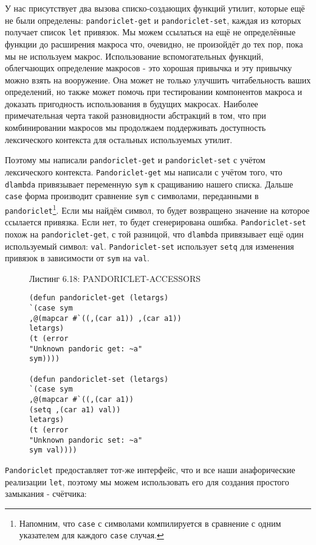 У нас присутствует два вызова списко-создающих функций утилит, которые ещё не были определены: \verb"pandoriclet-get" и \verb"pandoriclet-set", каждая из которых получает список \verb"let" привязок. Мы можем ссылаться на ещё не определённые функции до расширения макроса что, очевидно, не произойдёт до тех пор, пока мы не используем макрос. Использование вспомогательных функций, облегчающих определение макросов - это хорошая привычка и эту привычку можно взять на вооружение. Она может не только улучшить читабельность ваших определений, но также может помочь при тестировании компонентов макроса и доказать пригодность использования в будущих макросах. Наиболее примечательная черта такой разновидности абстракций в том, что при комбинировании макросов мы продолжаем поддерживать доступность лексического контекста для остальных используемых утилит.

Поэтому мы написали \verb"pandoriclet-get" и \verb"pandoriclet-set" с учётом лексического контекста. \verb"Pandoriclet-get" мы написали с учётом того, что \verb"dlambda" привязывает переменную \verb"sym" к сращиванию нашего списка. Дальше \verb"case" форма производит сравнение \verb"sym" с символами, переданными в \verb"pandoriclet"\footnote{Напомним, что \verb"case" с символами компилируется в сравнение с одним указателем для каждого \verb"case" случая.}. Если мы найдём символ, то будет возвращено значение на которое ссылается привязка. Если нет, то будет сгенерирована ошибка. \verb"Pandoriclet-set" похож на \verb"pandoriclet-get", с той разницой, что \verb"dlambda" привязывает ещё один используемый символ: \verb"val". \verb"Pandoriclet-set" использует \verb"setq" для изменения привязок в зависимости от \verb"sym" на \verb"val".



\begin{figure}Листинг 6.18: PANDORICLET-ACCESSORS\label{listing_6.18}
\listbegin
\begin{verbatim}
(defun pandoriclet-get (letargs)
`(case sym
,@(mapcar #`((,(car a1)) ,(car a1))
letargs)
(t (error
"Unknown pandoric get: ~a"
sym))))

(defun pandoriclet-set (letargs)
`(case sym
,@(mapcar #`((,(car a1))
(setq ,(car a1) val))
letargs)
(t (error
"Unknown pandoric set: ~a"
sym val))))
\end{verbatim}
\listend
\end{figure}

\verb"Pandoriclet" предоставляет тот-же интерфейс, что и все наши анафорические реализации \verb"let", поэтому мы можем использовать его для создания простого замыкания - счётчика:

